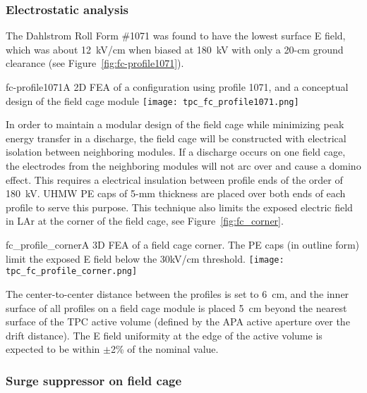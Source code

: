 \subsubsection{Electrostatic analysis}

The Dahlstrom Roll Form \#1071 was found to have the lowest surface E field, which was about 12~kV/cm when biased at 180~kV with only a 20-cm ground clearance (see Figure~\ref{fig:fc-profile1071}).

\begin{cdrfigure}{fc-profile1071}{A 2D FEA of a configuration using profile 1071, and a conceptual design of the field cage module}
\texttt{[image: tpc\_fc\_profile1071.png]}
\end{cdrfigure}
  
In order to maintain a modular design of the field cage while minimizing peak energy transfer in a discharge,%
the field cage will be constructed with electrical isolation between neighboring modules. %
If a discharge occurs on one field cage, the %
electrodes from the neighboring modules will not arc over and cause a domino effect.  This requires a 
electrical insulation between profile ends of the order of 180~kV.  UHMW PE caps of 5-mm thickness are placed over both ends of each profile to serve this purpose. This technique also limits the exposed electric field in LAr at the corner of the field cage, see Figure~\ref{fig:fc_corner}. 

\begin{cdrfigure}{fc_profile_corner}{A 3D FEA of a field cage corner.  The PE caps (in outline form) limit the exposed E field below the 30kV/cm threshold.}
\texttt{[image: tpc\_fc\_profile\_corner.png]}
\end{cdrfigure}

The center-to-center distance between the profiles is set to 6~cm, and the inner surface of all profiles on a field cage module is placed 5~cm beyond the nearest surface of the TPC active volume (defined by the APA active aperture over the drift distance). The E field uniformity at the edge of the active volume is expected to be within $\pm$2\% of the nominal value.


\subsubsection{Surge suppressor on field cage}

